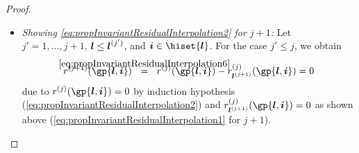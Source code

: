 \begin{proof}
\begin{itemize}
    As in the proof of \cref{lemma:combiTechniqueIdenticalValues},
    we exploit the tensor product nature of the basis functions and
    restrict $r_{\*l^{(j+1)}}^{(j)}$ to $S \cap \clint{0, 1}$:
    \begin{subequations}
      \begin{gather}
        (\restrictfcn{r_{\*l^{(j+1)}}^{(j)}}{S \cap \clint{0, 1}})(x_{t'})
        = \sum_{l'_{t'}=0}^{l_{t'}^{(j+1)}}
        \sum_{i'_{t'} \in \hiset{l'_{t'}}}
        \surplustilde[(j+1)]{l'_{t'},i'_{t'}}
        \basis{l'_{t'},i'_{t'}}(x_{t'}),\quad
        x_{t'} \in \clint{0, 1},\\
        \surplustilde[(j+1)]{l'_{t'},i'_{t'}}
        := \sum_{\*l'_{-t'}=\*0}^{\*l^{(j+1)}_{-t'}}
        \sum_{\*i'_{-t'} \in \hiset{\*l'_{-t'}}}
        \surplus[(j+1)]{\*l',\*i'} \cdot
        \basis{\*l'_{-t'},\*i'_{-t'}}(\gp{\*l_{-t'},\*i_{-t'}}).
      \end{gather}
    \end{subequations}
    This shows that
    $\restrictfcn{r_{\*l^{(j+1)}}^{(j)}}{S \cap \clint{0, 1}} \in
    \ns{l_{t'}^{(j+1)}}$ is an interpolant of the zero function
    (by \eqref{eq:proofPropInvariantResidualInterpolation2}).
    Due to the linear independence of the univariate basis functions,
    we conclude
    \begin{equation}
      \restrictfcn{r_{\*l^{(j+1)}}^{(j)}}{S \cap \clint{0, 1}}
      \equiv 0.
    \end{equation}
    Consequently, we obtain
    $r_{\*l^{(j+1)}}^{(j)}(\gp{\*l,\*i}) = 0$
    as $\gp{\*l,\*i} \in S \cap \clint{\*0, \*1}$.
    
    \item
    \emph{Showing \eqref{eq:propInvariantResidualInterpolation2} for $j + 1$:}
    Let $j' = 1, \dotsc, j + 1$, ${\boldsymbol{l}} \le {\boldsymbol{l}}^{(j')}$,
    and $\*i \in \hiset{\*l}$.
    For the case $j' \le j$, we obtain
    \begin{equation}
      \label{eq:proofPropInvariantResidualInterpolation1}
      r^{(j+1)}(\gp{\*l,\*i})
      \eqwithref{6}
      r^{(j)}(\gp{\*l,\*i}) - r_{\*l^{(j+1)}}^{(j)}(\gp{\*l,\*i})
      = 0
    \end{equation}
    due to $r^{(j)}(\gp{\*l,\*i}) = 0$ by induction hypothesis
    (\cref{eq:propInvariantResidualInterpolation2}) and
    $r_{\*l^{(j+1)}}^{(j)}(\gp{\*l,\*i}) = 0$ as shown above
    (\cref{eq:propInvariantResidualInterpolation1} for $j + 1$).
    

\end{itemize}
\end{proof}
